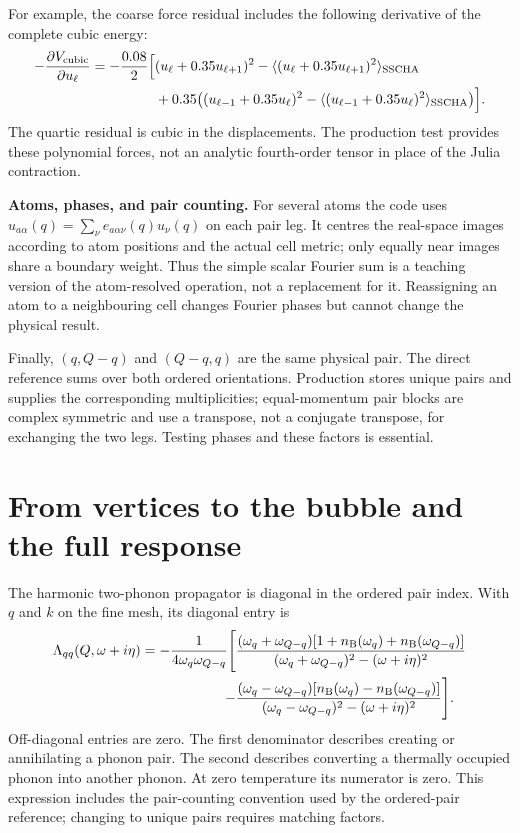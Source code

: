 \documentclass[11pt,a4paper]{article}
\newcommand{\pageheading}[1]{\clearpage\section{#1}}
\begin{document}
For example, the coarse force residual includes the following derivative
of the complete cubic energy:
\begin{align}
 -\frac{\partial V_{\rm cubic}}{\partial u_\ell}
 =-\frac{0.08}{2}\Big[&(u_\ell+0.35u_{\ell+1})^2
        -\langle(u_\ell+0.35u_{\ell+1})^2\rangle_{\rm SSCHA}\notag\\
 &+0.35\big((u_{\ell-1}+0.35u_\ell)^2
        -\langle(u_{\ell-1}+0.35u_\ell)^2\rangle_{\rm SSCHA}\big)\Big].
\end{align}
The quartic residual is cubic in the displacements. The production test
provides these polynomial forces, not an analytic fourth-order tensor in
place of the Julia contraction.

\textbf{Atoms, phases, and pair counting.} For several atoms the code uses
$u_{a\alpha}(q)=\sum_\nu e_{a\alpha\nu}(q)u_\nu(q)$ on each pair leg. It centres
the real-space images according to atom positions and the actual cell metric;
only equally near images share a boundary weight. Thus the simple scalar
Fourier sum is a teaching version of the atom-resolved operation, not a
replacement for it. Reassigning an atom to a neighbouring cell changes Fourier
phases but cannot change the physical result.

Finally, $(q,Q-q)$ and $(Q-q,q)$ are the same physical pair. The direct
reference sums over both ordered orientations. Production stores unique
pairs and supplies the corresponding multiplicities; equal-momentum pair
blocks are complex symmetric and use a transpose, not a conjugate transpose,
for exchanging the two legs. Testing phases and these factors is essential.

\pageheading{From vertices to the bubble and the full response}
The harmonic two-phonon propagator is diagonal in the ordered pair index.
With $q$ and $k$ on the fine mesh, its diagonal entry is
\begin{align}
 \Lambda_{qq}(Q,\omega+i\eta)
 =-\frac{1}{4\omega_q\omega_{Q-q}}\Bigg[
 &\frac{(\omega_q+\omega_{Q-q})
 [1+n_{\rm B}(\omega_q)+n_{\rm B}(\omega_{Q-q})]}
 {(\omega_q+\omega_{Q-q})^2-(\omega+i\eta)^2}\notag\\
 -&\frac{(\omega_q-\omega_{Q-q})
 [n_{\rm B}(\omega_q)-n_{\rm B}(\omega_{Q-q})]}
 {(\omega_q-\omega_{Q-q})^2-(\omega+i\eta)^2}\Bigg].
\end{align}
Off-diagonal entries are zero. The first denominator describes creating or
annihilating a phonon pair. The second describes converting a thermally
occupied phonon into another phonon. At zero temperature its numerator is
zero. This expression includes the pair-counting convention used by the
ordered-pair reference; changing to unique pairs requires matching factors.
\end{document}
